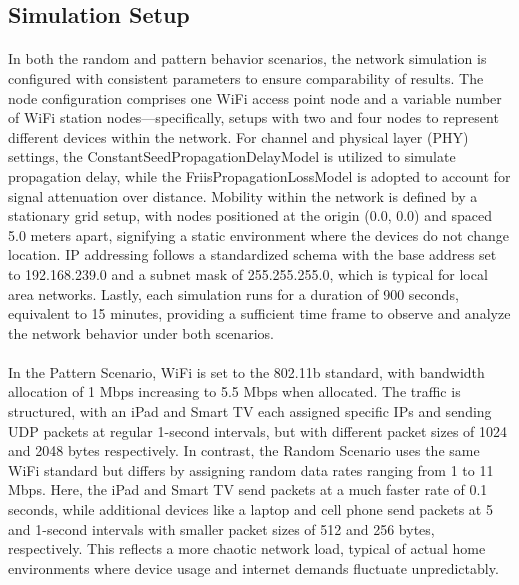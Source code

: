 \documentclass[10pt]{article}
\begin{document}
\subsection{Simulation Setup}
\paragraph{}
In both the random and pattern behavior scenarios, the network simulation is configured with consistent parameters to ensure comparability of results. The node configuration comprises one WiFi access point node and a variable number of WiFi station nodes—specifically, setups with two and four nodes to represent different devices within the network. For channel and physical layer (PHY) settings, the ConstantSeedPropagationDelayModel is utilized to simulate propagation delay, while the FriisPropagationLossModel is adopted to account for signal attenuation over distance. Mobility within the network is defined by a stationary grid setup, with nodes positioned at the origin (0.0, 0.0) and spaced 5.0 meters apart, signifying a static environment where the devices do not change location. IP addressing follows a standardized schema with the base address set to 192.168.239.0 and a subnet mask of 255.255.255.0, which is typical for local area networks. Lastly, each simulation runs for a duration of 900 seconds, equivalent to 15 minutes, providing a sufficient time frame to observe and analyze the network behavior under both scenarios.

\paragraph{}
In the Pattern Scenario, WiFi is set to the 802.11b standard, with bandwidth allocation of 1 Mbps increasing to 5.5 Mbps when allocated. The traffic is structured, with an iPad and Smart TV each assigned specific IPs and sending UDP packets at regular 1-second intervals, but with different packet sizes of 1024 and 2048 bytes respectively. In contrast, the Random Scenario uses the same WiFi standard but differs by assigning random data rates ranging from 1 to 11 Mbps. Here, the iPad and Smart TV send packets at a much faster rate of 0.1 seconds, while additional devices like a laptop and cell phone send packets at 5 and 1-second intervals with smaller packet sizes of 512 and 256 bytes, respectively. This reflects a more chaotic network load, typical of actual home environments where device usage and internet demands fluctuate unpredictably.
\end{document}
